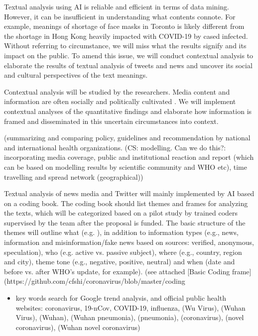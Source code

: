 Textual analysis using AI is reliable and efficient in terms of data mining.  However, it can be insufficient in understanding what contents connote.  For example, meanings of shortage of face masks in Toronto is likely different from the shortage in Hong Kong heavily impacted with COVID-19 by cased infected.  Without referring to circumstance, we will miss what the results signify and its impact on the public.  To amend this issue, we will conduct contextual analysis \citep{} to elaborate the results of textual analysis of tweets and news and uncover its social and cultural perspectives of the text meanings.

Contextual analysis will be studied by the researchers.  Media content and information are often socially and politically cultivated \cite{}.  We will  implement contextual analyses of the quantitative findings and elaborate how information is framed and disseminated in this uncertain circumstances into context.

(summarizing and comparing policy, guidelines and recommendation by national and international health organizations.
(CS: modelling. Can we do this?:  incorporating media coverage, public and institutional reaction and report (which can be based on modelling results by scientific community and WHO etc), time travelling and spread network (geographical))


Textual analysis of news media and Twitter will mainly implemented by AI based on a coding book.  The coding book should list themes and frames for analyzing the texts, which will be categorized based on a pilot study by trained coders supervised by the team after the proposal is funded.  The basic structure of the themes will outline what (e.g. ), in addition to information types  (e.g., news, information and misinformation/fake news based on sources: verified, anonymous, speculation), who (e.g. active vs. passive subject), where (e.g., country, region and city), theme tone (e.g., negative, positive, neutral) and when (date and before vs. after WHO’s update, for example).  (see  attached [Basic Coding frame](https://github.com/cfshi/coronavirus/blob/master/coding%


\begin{itemize}
\item{key words search for Google trend analysis, and official public health websites: coronavirus, 19-nCov, COVID-19, influenza, (Wu Virus), (Wuhan Virus), (Wuhan), (Wuhan pneumonia), (pneumonia), (coronavirus), (novel coronavirus), (Wuhan novel coronavirus)}
\end{itemize}

